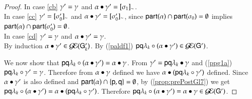 \begin{proof}
 In case \ref{cb} $\comocc'=\comocc$ and $\postG{\comocc'}{\alpha}=\eqclass{\comseq_1}$.\\
 In case \ref{cc} $\comocc'=\eqclass{\comseq_0'}$ and $\postG{\comocc'}{\alpha}=\eqclass{\comseq_0'}$, since $\participant{\alpha}\cap\participant{\comseq_0}=\emptyset$ implies $\participant{\alpha}\cap\participant{\comseq_0'}=\emptyset$.\\
 In case \ref{cd} $\comocc'=\comocc$ and $\postG{\comocc'}{\alpha}=\comocc$.\\
 By induction $\postG{\comocc'}{\alpha}\in\EGG(\G'_k)$. By (\ref{paldf1}) $\preG{(\postG{\comocc'}{\alpha})}{\Comm\pp{\la_k}\q}\in \EGG(\G')$. 
 
 We now show that $\preG{(\postG{\comocc'}{\alpha})}{\Comm\pp{\la_k}\q}=\postG\comocc{\alpha}$. From $\comocc'=\postG\comocc{\Comm\pp{\la_k}\q}$
 and (\ref{ppg1a})  
 $\preG{\comocc'}{\Comm\pp{\la_k}\q}=\comocc$. Therefore from $\postG{\comocc}{\alpha}$ defined
 we have $\postG{(\preG{\comocc'}{\Comm\pp{\la_k}\q})}{\alpha}$ defined.
 Since $\postG{\comocc'}{\alpha}$ is also defined and $\participant{\alpha}\cap\set{\pp,\q}=\emptyset$, by 
 (\ref{prop:prePostGl7}) we get 
 $\preG{(\postG{\comocc'}{\alpha})}{\Comm\pp{\la_k}\q}=\postG{(\preG{\comocc'}{\Comm\pp{\la_k}\q})}{\alpha}$.
 Therefore $\preG{(\postG{\comocc'}{\alpha})}{\Comm\pp{\la_k}\q}=\postG{\comocc}{\alpha}\in \EGG(\G')$.
\end{proof}

